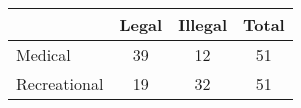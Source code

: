 {
\def\sym#1{\ifmmode^{#1}\else\(^{#1}\)\fi}
\begin{tabular}{l*{1}{ccc}}
\hline\hline
                    &       Legal&     Illegal&       Total\\
\hline
Medical             &          39&          12&          51\\
Recreational        &          19&          32&          51\\
\hline\hline
\end{tabular}
}
